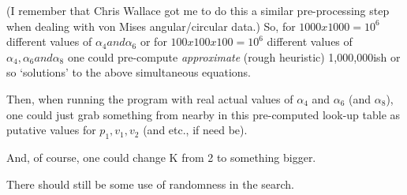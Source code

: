 \documentclass{elsarticle}
\begin{document}
(I remember that Chris Wallace got me to do this a similar pre-processing step when dealing with von Mises angular/circular data.)
So, for $1000 x 1000 = 10^6$ different values of $\alpha_4 and \alpha_6$
or for $100 x 100 x 100 = 10^6$ different values of $\alpha_4, \alpha_6 and \alpha_8$
one could pre-compute {\em approximate} (rough heuristic) 1,000,000ish or so `solutions' to the above simultaneous equations.

Then, when running the program with real actual values of $\alpha_4$ and $\alpha_6$ (and $\alpha_8$),
one could just grab something from nearby in this pre-computed look-up table
as putative values for $p_1, v_1, v_2$ (and etc., if need be).

And, of course, one could change K from 2 to something bigger.

There should still be some use of randomness in the search.

\begin{thebibliography}{}



\end{thebibliography}
\end{document}
